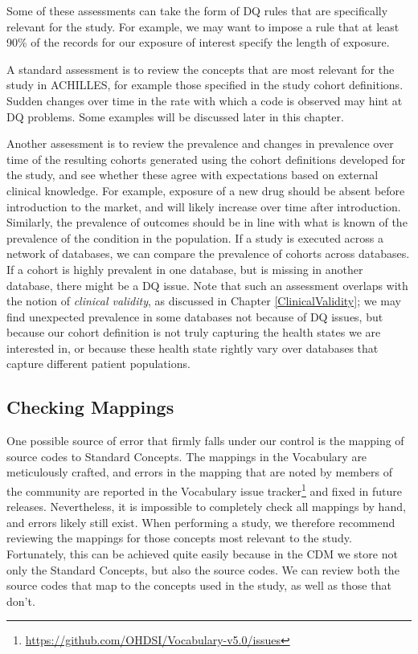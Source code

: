 \documentclass[11pt]{book}
\let\rmarkdownfootnote\footnote%
\def\footnote{\protect\rmarkdownfootnote}
\theoremstyle{definition}
\theoremstyle{definition}
\theoremstyle{definition}
\theoremstyle{remark}
\begin{document}
Some of these assessments can take the form of DQ rules that are
specifically relevant for the study. For example, we may want to impose
a rule that at least 90\% of the records for our exposure of interest
specify the length of exposure.

A standard assessment is to review the concepts that are most relevant
for the study in ACHILLES, for example those specified in the study
cohort definitions. Sudden changes over time in the rate with which a
code is observed may hint at DQ problems. Some examples will be
discussed later in this chapter.

Another assessment is to review the prevalence and changes in prevalence
over time of the resulting cohorts generated using the cohort
definitions developed for the study, and see whether these agree with
expectations based on external clinical knowledge. For example, exposure
of a new drug should be absent before introduction to the market, and
will likely increase over time after introduction. Similarly, the
prevalence of outcomes should be in line with what is known of the
prevalence of the condition in the population. If a study is executed
across a network of databases, we can compare the prevalence of cohorts
across databases. If a cohort is highly prevalent in one database, but
is missing in another database, there might be a DQ issue. Note that
such an assessment overlaps with the notion of \emph{clinical validity},
as discussed in Chapter \ref{ClinicalValidity}; we may find unexpected
prevalence in some databases not because of DQ issues, but because our
cohort definition is not truly capturing the health states we are
interested in, or because these health state rightly vary over databases
that capture different patient populations.

\subsection{Checking Mappings}\label{checking-mappings}

One possible source of error that firmly falls under our control is the
mapping of source codes to Standard Concepts. The mappings in the
Vocabulary are meticulously crafted, and errors in the mapping that are
noted by members of the community are reported in the Vocabulary issue
tracker\footnote{\url{https://github.com/OHDSI/Vocabulary-v5.0/issues}}
and fixed in future releases. Nevertheless, it is impossible to
completely check all mappings by hand, and errors likely still exist.
When performing a study, we therefore recommend reviewing the mappings
for those concepts most relevant to the study. Fortunately, this can be
achieved quite easily because in the CDM we store not only the Standard
Concepts, but also the source codes. We can review both the source codes
that map to the concepts used in the study, as well as those that don't.
\end{document}
